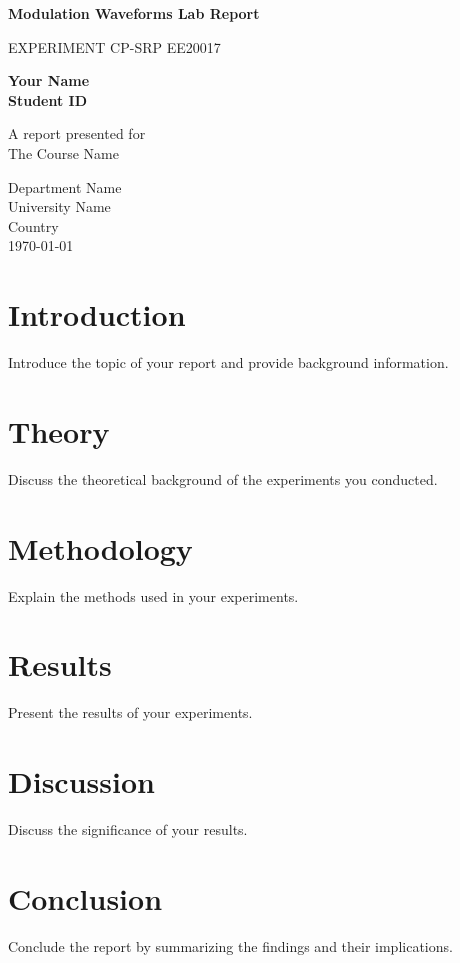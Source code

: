 \documentclass[15pt,a4paper]{article}
\begin{document}
\begin{titlepage}
    \begin{center}
        \vspace*{1cm}

        \Huge
        \textbf{Modulation Waveforms Lab Report}

        \vspace{0.5cm}
        \LARGE
        EXPERIMENT CP-SRP
        EE20017
        
        \vspace{1.5cm}

        \textbf{Your Name}\\
        \textbf{Student ID}

        \vfill
        
        A report presented for\\
        The Course Name

        \vspace{0.8cm}

        
        \Large
        Department Name\\
        University Name\\
        Country\\
        \today

    \end{center}
\end{titlepage}

\newpage
\tableofcontents
\newpage

\section{Introduction}
Introduce the topic of your report and provide background information.

\section{Theory}
Discuss the theoretical background of the experiments you conducted.

\section{Methodology}
Explain the methods used in your experiments.

\section{Results}
Present the results of your experiments.

\section{Discussion}
Discuss the significance of your results.

\section{Conclusion}
Conclude the report by summarizing the findings and their implications.
\end{document}
